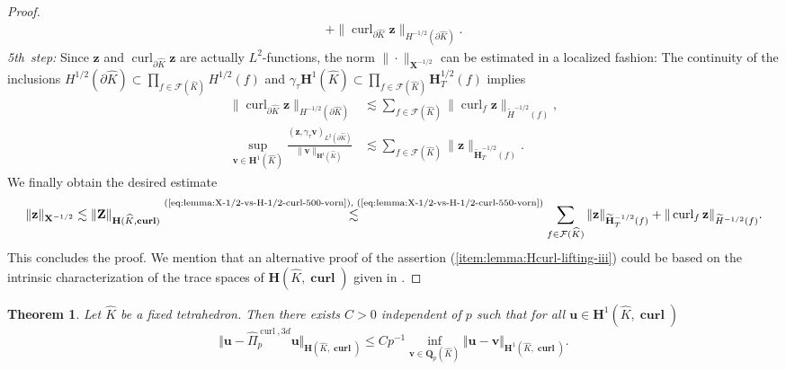 \documentclass{article}
\newtheorem{theorem}{Theorem}[section]
\newcommand{\hatPicurlcom}{\widehat \Pi^{\operatorname*{curl},3d}_p}
\begin{document}
\begin{proof}
\begin{align}
 + \|\operatorname{curl}_{\partial \widehat K} {\mathbf z}\|_{H^{-1/2}(\partial \widehat K)}.
\end{align}
\emph{5th~step:}
Since ${\mathbf z}$ and 
$\operatorname{curl}_{\partial\widehat{K}} {\mathbf z}$ are actually $L^2$-functions, the norm 
$\|\cdot\|_{{\mathbf  X}^{-1/2}}$ can be estimated in a localized fashion: 
The continuity of the  inclusions 
$H^{1/2}(\partial\widehat{K}) \subset \prod_{f \in {\mathcal F}(\widehat{K})} H^{1/2}(f)$ 
and $\gamma_\tau {\mathbf H}^{1}(\widehat{K}) \subset 
\prod_{f \in {\mathcal F}(\widehat{K})} {\mathbf H}_T^{1/2}(f)$ implies 
\begin{subequations}
\label{eq:lemma:X-1/2-vs-H-1/2-curl-550-vorn}
\begin{align}
\|\operatorname{curl}_{\partial \widehat{K}} {\mathbf z}\|_{H^{-1/2}(\partial\widehat{K})} & \lesssim 
\sum_{f \in {\mathcal F}(\widehat{K})} \|\operatorname{curl}_f {\mathbf z}\|_{\widetilde{H}^{-1/2}(f)},  \\
\sup_{{\mathbf v} \in {\mathbf H}^1(\widehat K)} 
  \frac{({\mathbf z},\gamma_\tau {\mathbf v})_{L^2(\partial\widehat K)}}
       {\|{\mathbf v}\|_{{\mathbf H}^1(\widehat K)}} & \lesssim 
\sum_{f \in {\mathcal F}(\widehat{K})} \|{\mathbf z}\|_{\widetilde{\mathbf{H}}^{-1/2}_T(f)}. 
\end{align}
\end{subequations}
We finally obtain the desired estimate
$$
\|{\mathbf  z} \|_{{\mathbf X}^{-1/2}} 
\lesssim \|{\mathbf Z}\|_{{\mathbf H}(\widehat K,\operatorname{\mathbf{curl}}) }
\stackrel{\text{(\ref{eq:lemma:X-1/2-vs-H-1/2-curl-500-vorn}), 
(\ref{eq:lemma:X-1/2-vs-H-1/2-curl-550-vorn})}}{\lesssim}\sum_{f \in {\mathcal F}(\widehat K)} 
\|{\mathbf z}\|_{\widetilde{\mathbf{H}}^{-1/2}_T(f)} + 
\|\operatorname{curl}_f {\mathbf z}\|_{\widetilde{H}^{-1/2}(f)}. 
$$
This concludes the proof. We mention that an alternative proof of 
the assertion (\ref{item:lemma:Hcurl-lifting-iii}) could be based on the intrinsic characterization
of the trace spaces of ${\mathbf H}(\widehat K,\operatorname{\mathbf{curl}})$ given in 
\cite{BuffaCiarlet2001,BuffaCiarlet2001b}.
\end{proof}

\begin{theorem}
\label{thm:H1curl-approximation} 
Let $\widehat K$ be a fixed tetrahedron. Then
there exists $C>0$ independent of $p$ such
that for all ${\mathbf{u}}\in{\mathbf{H}}^{1}(\widehat{K},\operatorname{\mathbf{curl}})$
\begin{equation}
\Vert{\mathbf{u}}-\hatPicurlcom{\mathbf{u}}%
\Vert_{{\mathbf{H}}(\widehat{K},\operatorname{\mathbf{curl}})}\leq Cp^{-1}%
\inf_{{\mathbf v} \in {\mathbf Q}_p(\widehat K)}
\Vert{\mathbf{u}} - \mathbf{v}\Vert_{{\mathbf{H}}^{1}(\widehat{K},\operatorname{\mathbf{curl}})}.
\label{eq:thmH1curl-approximation-10}%
\end{equation}
\end{theorem}
\end{document}
